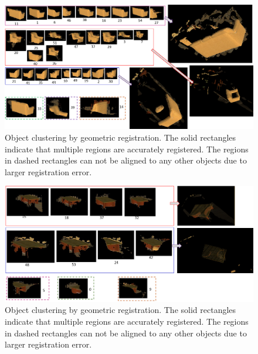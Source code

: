 \begin{figure}
	\centering
	\includegraphics[width=2\columnwidth]{figures/set1/object_set1.png}
	\caption{Object clustering by geometric registration. The solid rectangles indicate that multiple regions are accurately registered. The regions in dashed rectangles can not be aligned to any other objects due to larger registration error. }
	\label{fig:cluster_object_1}
\end{figure}


\begin{figure}
	\centering
	\includegraphics[width=2\columnwidth]{figures/set1/object_set2.png}
	\caption{Object clustering by geometric registration. The solid rectangles indicate that multiple regions are accurately registered. The regions in dashed rectangles can not be aligned to any other objects due to larger registration error. }
	\label{fig:cluster_object_2}
\end{figure}


